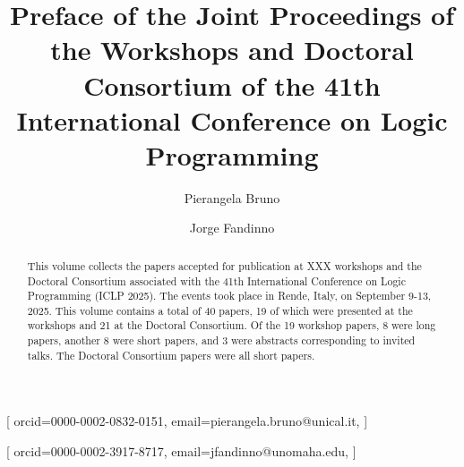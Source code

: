 \documentclass[
]{ceurart}
\begin{document}


\title{Preface of the Joint Proceedings of the Workshops and Doctoral Consortium of the 41th International Conference on Logic Programming}


\author[1]{Pierangela Bruno}[%
orcid=0000-0002-0832-0151,
email=pierangela.bruno@unical.it,
]
\address[2]{University of Calabria, Italy}


\author[2]{Jorge Fandinno}[%
orcid=0000-0002-3917-8717,
email=jfandinno@unomaha.edu,
]
\address[2]{University of Nebraska Omaha, USA}

\def\changemargin#1#2{\list{}{\rightmargin#2\leftmargin#1}\item[]}
\let\endchangemargin=\endlist 


\newcommand{\workshop}[3]{\section{#2}\vspace{-8pt}\begin{changemargin}{19pt}{8pt} 
\rm\normalsize\it #1 #2 (#3)\end{changemargin}}


\begin{abstract}
This volume collects the papers accepted for publication at XXX workshops and the Doctoral Consortium associated with the 41th International Conference on Logic Programming (ICLP 2025).
%
The events took place in Rende, Italy, on September 9-13, 2025.
%
This volume contains a total of 40 papers, 19 of which were presented at the workshops and 21 at the Doctoral Consortium.
%
Of the 19 workshop papers, 8 were long papers, another 8 were short papers, and 3 were abstracts corresponding to invited talks.
%
The Doctoral Consortium papers were all short papers.
\end{abstract}
\end{document}
